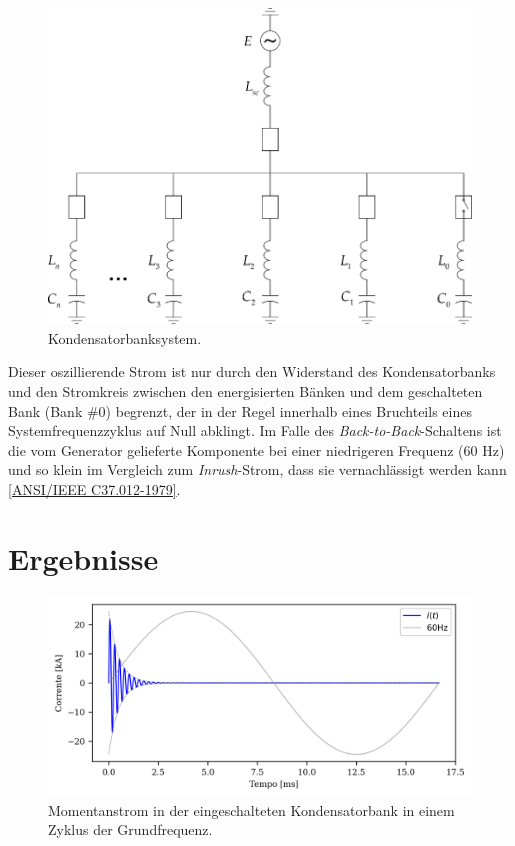 \documentclass[a4paper]{article}
\begin{document}
\begin{figure}[!hbp]
	\centering
	\includegraphics{Picture1.png}
	\caption{Kondensatorbanksystem.}
	\label{fig:picture1}
\end{figure}

Dieser oszillierende Strom ist nur durch den Widerstand des Kondensatorbanks und den Stromkreis zwischen den energisierten Bänken und dem geschalteten Bank (Bank \#0) begrenzt, der in der Regel innerhalb eines Bruchteils eines Systemfrequenzzyklus auf Null abklingt. Im Falle des \textit{Back-to-Back}-Schaltens ist die vom Generator gelieferte Komponente bei einer niedrigeren Frequenz (60 Hz) und so klein im Vergleich zum \textit{Inrush}-Strom, dass sie vernachlässigt werden kann \href{https://ieeexplore.ieee.org/document/7035261}{[ANSI/IEEE C37.012-1979]}.

\section{Ergebnisse}
\begin{figure}[!hbp]
	\centering
	\includegraphics{Correntes.png}
	\caption{Momentanstrom in der eingeschalteten Kondensatorbank in einem Zyklus der Grundfrequenz.}
	\label{fig:picture2}
\end{figure}
\end{document}
